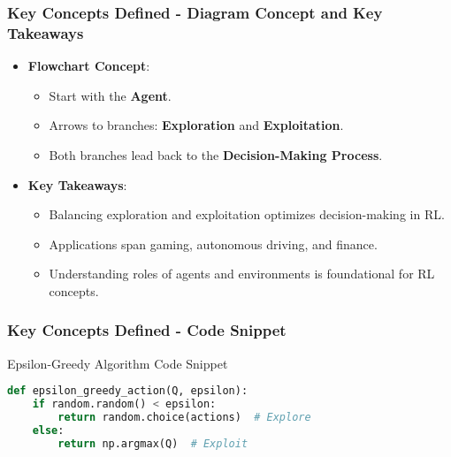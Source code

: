 \documentclass[aspectratio=169]{beamer}
\begin{document}
\begin{frame}[fragile]
    \frametitle{Key Concepts Defined - Diagram Concept and Key Takeaways}
    \begin{itemize}
        \item \textbf{Flowchart Concept}:
        \begin{itemize}
            \item Start with the \textbf{Agent}.
            \item Arrows to branches: \textbf{Exploration} and \textbf{Exploitation}.
            \item Both branches lead back to the \textbf{Decision-Making Process}.
        \end{itemize}
        
        \item \textbf{Key Takeaways}:
        \begin{itemize}
            \item Balancing exploration and exploitation optimizes decision-making in RL.
            \item Applications span gaming, autonomous driving, and finance.
            \item Understanding roles of agents and environments is foundational for RL concepts.
        \end{itemize}
    \end{itemize}
\end{frame}

\begin{frame}[fragile]
    \frametitle{Key Concepts Defined - Code Snippet}
    \begin{block}{Epsilon-Greedy Algorithm Code Snippet}
    \begin{lstlisting}[language=Python]
def epsilon_greedy_action(Q, epsilon):
    if random.random() < epsilon:
        return random.choice(actions)  # Explore
    else:
        return np.argmax(Q)  # Exploit
    \end{lstlisting}
    \end{block}
\end{frame}
\end{document}
